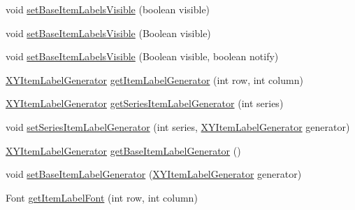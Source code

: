 \begin{DoxyCompactItemize}
\item 
void \mbox{\hyperlink{interfaceorg_1_1jfree_1_1chart_1_1renderer_1_1xy_1_1_x_y_item_renderer_ac684655063a646d75697136fd62a65aa}{set\+Base\+Item\+Labels\+Visible}} (boolean visible)
\item 
void \mbox{\hyperlink{interfaceorg_1_1jfree_1_1chart_1_1renderer_1_1xy_1_1_x_y_item_renderer_a33f1c11ed3784b904496987e9063f650}{set\+Base\+Item\+Labels\+Visible}} (Boolean visible)
\item 
void \mbox{\hyperlink{interfaceorg_1_1jfree_1_1chart_1_1renderer_1_1xy_1_1_x_y_item_renderer_af9b47701f840b27512709b5dc55532aa}{set\+Base\+Item\+Labels\+Visible}} (Boolean visible, boolean notify)
\item 
\mbox{\hyperlink{interfaceorg_1_1jfree_1_1chart_1_1labels_1_1_x_y_item_label_generator}{X\+Y\+Item\+Label\+Generator}} \mbox{\hyperlink{interfaceorg_1_1jfree_1_1chart_1_1renderer_1_1xy_1_1_x_y_item_renderer_a3d045954d83096495f635a1681567f8f}{get\+Item\+Label\+Generator}} (int row, int column)
\item 
\mbox{\hyperlink{interfaceorg_1_1jfree_1_1chart_1_1labels_1_1_x_y_item_label_generator}{X\+Y\+Item\+Label\+Generator}} \mbox{\hyperlink{interfaceorg_1_1jfree_1_1chart_1_1renderer_1_1xy_1_1_x_y_item_renderer_a1e5440f518283fdbc088ce0aad7002c3}{get\+Series\+Item\+Label\+Generator}} (int series)
\item 
void \mbox{\hyperlink{interfaceorg_1_1jfree_1_1chart_1_1renderer_1_1xy_1_1_x_y_item_renderer_a8887feead656e9b57ce1bb2847c1421c}{set\+Series\+Item\+Label\+Generator}} (int series, \mbox{\hyperlink{interfaceorg_1_1jfree_1_1chart_1_1labels_1_1_x_y_item_label_generator}{X\+Y\+Item\+Label\+Generator}} generator)
\item 
\mbox{\hyperlink{interfaceorg_1_1jfree_1_1chart_1_1labels_1_1_x_y_item_label_generator}{X\+Y\+Item\+Label\+Generator}} \mbox{\hyperlink{interfaceorg_1_1jfree_1_1chart_1_1renderer_1_1xy_1_1_x_y_item_renderer_a8f57b67c1de4f5a63fc6f55dba4be0f6}{get\+Base\+Item\+Label\+Generator}} ()
\item 
void \mbox{\hyperlink{interfaceorg_1_1jfree_1_1chart_1_1renderer_1_1xy_1_1_x_y_item_renderer_adb2a89010f4e58e1b4efc1a0e4c1df22}{set\+Base\+Item\+Label\+Generator}} (\mbox{\hyperlink{interfaceorg_1_1jfree_1_1chart_1_1labels_1_1_x_y_item_label_generator}{X\+Y\+Item\+Label\+Generator}} generator)
\item 
Font \mbox{\hyperlink{interfaceorg_1_1jfree_1_1chart_1_1renderer_1_1xy_1_1_x_y_item_renderer_a4c9847cbebb2ef09db70b65d3c8f40db}{get\+Item\+Label\+Font}} (int row, int column)

\end{DoxyCompactItemize}
